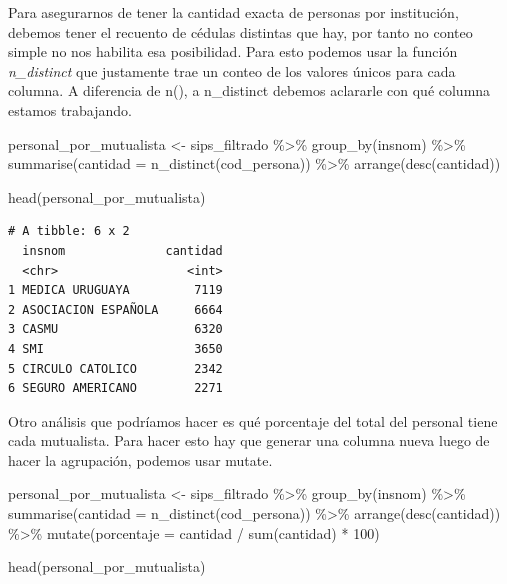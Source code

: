 \documentclass[
  letterpaper,
  DIV=11,
  numbers=noendperiod]{scrreprt}
\newenvironment{Shaded}{\begin{snugshade}}{\end{snugshade}}
\newcommand{\AttributeTok}[1]{\textcolor[rgb]{0.40,0.45,0.13}{#1}}
\newcommand{\DecValTok}[1]{\textcolor[rgb]{0.68,0.00,0.00}{#1}}
\newcommand{\FunctionTok}[1]{\textcolor[rgb]{0.28,0.35,0.67}{#1}}
\newcommand{\NormalTok}[1]{\textcolor[rgb]{0.00,0.23,0.31}{#1}}
\newcommand{\OtherTok}[1]{\textcolor[rgb]{0.00,0.23,0.31}{#1}}
\newcommand{\SpecialCharTok}[1]{\textcolor[rgb]{0.37,0.37,0.37}{#1}}
\begin{document}
Para asegurarnos de tener la cantidad exacta de personas por
institución, debemos tener el recuento de cédulas distintas que hay, por
tanto no conteo simple no nos habilita esa posibilidad. Para esto
podemos usar la función \emph{n\_distinct} que justamente trae un conteo
de los valores únicos para cada columna. A diferencia de n(), a
n\_distinct debemos aclararle con qué columna estamos trabajando.

\begin{Shaded}
\begin{Highlighting}[]
\NormalTok{personal\_por\_mutualista }\OtherTok{\textless{}{-}}\NormalTok{ sips\_filtrado }\SpecialCharTok{\%\textgreater{}\%} 
  \FunctionTok{group\_by}\NormalTok{(insnom) }\SpecialCharTok{\%\textgreater{}\%} 
  \FunctionTok{summarise}\NormalTok{(}\AttributeTok{cantidad =} \FunctionTok{n\_distinct}\NormalTok{(cod\_persona)) }\SpecialCharTok{\%\textgreater{}\%} 
  \FunctionTok{arrange}\NormalTok{(}\FunctionTok{desc}\NormalTok{(cantidad))}

\FunctionTok{head}\NormalTok{(personal\_por\_mutualista)}
\end{Highlighting}
\end{Shaded}

\begin{verbatim}
# A tibble: 6 x 2
  insnom              cantidad
  <chr>                  <int>
1 MEDICA URUGUAYA         7119
2 ASOCIACION ESPAÑOLA     6664
3 CASMU                   6320
4 SMI                     3650
5 CIRCULO CATOLICO        2342
6 SEGURO AMERICANO        2271
\end{verbatim}

Otro análisis que podríamos hacer es qué porcentaje del total del
personal tiene cada mutualista. Para hacer esto hay que generar una
columna nueva luego de hacer la agrupación, podemos usar mutate.

\begin{Shaded}
\begin{Highlighting}[]
\NormalTok{personal\_por\_mutualista }\OtherTok{\textless{}{-}}\NormalTok{ sips\_filtrado }\SpecialCharTok{\%\textgreater{}\%} 
  \FunctionTok{group\_by}\NormalTok{(insnom) }\SpecialCharTok{\%\textgreater{}\%} 
  \FunctionTok{summarise}\NormalTok{(}\AttributeTok{cantidad =} \FunctionTok{n\_distinct}\NormalTok{(cod\_persona)) }\SpecialCharTok{\%\textgreater{}\%} 
  \FunctionTok{arrange}\NormalTok{(}\FunctionTok{desc}\NormalTok{(cantidad)) }\SpecialCharTok{\%\textgreater{}\%} 
  \FunctionTok{mutate}\NormalTok{(}\AttributeTok{porcentaje =}\NormalTok{ cantidad }\SpecialCharTok{/} \FunctionTok{sum}\NormalTok{(cantidad) }\SpecialCharTok{*} \DecValTok{100}\NormalTok{)}

\FunctionTok{head}\NormalTok{(personal\_por\_mutualista)}
\end{Highlighting}
\end{Shaded}
\end{document}

